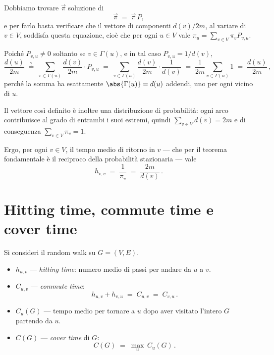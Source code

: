 \begin{dimostrazione}
  Dobbiamo trovare $\vec{\pi}$ soluzione di
  \[
    \vec{\pi} \;=\; \vec{\pi}\,P ,
  \]
  e per farlo basta verificare che il vettore di componenti $d(v)/2m$, al variare di
  $v \in V$, soddisfa questa equazione, cioè che per ogni $u \in V$ vale
  $\pi_u = \sum_{v \in V} \pi_v P_{v,u}$.

  Poiché $P_{v,u} \neq 0$ soltanto se $v \in \Gamma(u)$, e in tal caso
  $P_{v,u} = 1/d(v)$,
  \[
    \frac{d(u)}{2m}
    \;\overset{?}{=}\;
    \sum_{v \in \Gamma(u)} \frac{d(v)}{2m} \cdot P_{v,u}
    \;=\;
    \sum_{v \in \Gamma(u)} \frac{d(v)}{2m} \cdot \frac{1}{d(v)}
    \;=\;
    \frac{1}{2m} \sum_{v \in \Gamma(u)} 1
    \;=\;
    \frac{d(u)}{2m} \,,
  \]
  perché la somma ha esattamente $\abs{\Gamma(u)} = d(u)$ addendi, uno per ogni vicino di $u$.

  Il vettore così definito è inoltre una distribuzione di probabilità: ogni arco contribuisce
  al grado di entrambi i suoi estremi, quindi $\sum_{v \in V} d(v) = 2m$ e di conseguenza
  $\sum_{v \in V} \pi_v = 1$.
\end{dimostrazione}

Ergo, per ogni $v \in V$, il tempo medio di ritorno in $v$ --- che per il teorema
fondamentale è il reciproco della probabilità stazionaria --- vale
\[
  h_{v,v} \;=\; \frac{1}{\pi_v} \;=\; \frac{2m}{d(v)} \,.
\]

\section{Hitting time, commute time e cover time}

\begin{definizione}\label{def:tempi}
  Si consideri il random walk su $G = (V,E)$.
  \begin{itemize}
    \item $h_{u,v}$ --- \emph{hitting time}: numero medio di passi per andare da $u$ a $v$.
    \item $C_{u,v}$ --- \emph{commute time}:
      \[
        h_{u,v} + h_{v,u} \;=\; C_{u,v} \;=\; C_{v,u} \,.
      \]
    \item $C_u(G)$ --- tempo medio per tornare a $u$ dopo aver visitato l'intero $G$
      partendo da $u$.
    \item $C(G)$ --- \emph{cover time} di $G$:
      \[
        C(G) \;=\; \max_{u} \, C_u(G) \,.
      \]
  \end{itemize}
\end{definizione}

